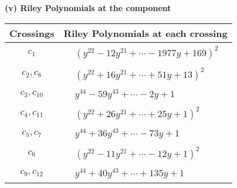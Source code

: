 \documentclass[1p]{elsarticle_modified}
\theoremstyle{definition}
\begin{document}
\newpage\renewcommand{\arraystretch}{1}
\flushleft \textbf{(v) Riley Polynomials at the component}\newline \\
\begin{tabular}{m{50pt}|m{274pt}}
Crossings & \hspace{64pt}Riley Polynomials at each crossing \\
\hline $$\begin{aligned}c_{1}\end{aligned}$$&$\begin{aligned}
&(y^{22}-12 y^{21}+\cdots-1977 y+169)^{2}
\end{aligned}$\\
\hline $$\begin{aligned}c_{2},c_{8}\end{aligned}$$&$\begin{aligned}
&(y^{22}+16 y^{21}+\cdots+51 y+13)^{2}
\end{aligned}$\\
\hline $$\begin{aligned}c_{3},c_{10}\end{aligned}$$&$\begin{aligned}
&y^{44}-59 y^{43}+\cdots-2 y+1
\end{aligned}$\\
\hline $$\begin{aligned}c_{4},c_{11}\end{aligned}$$&$\begin{aligned}
&(y^{22}+26 y^{21}+\cdots+25 y+1)^{2}
\end{aligned}$\\
\hline $$\begin{aligned}c_{5},c_{7}\end{aligned}$$&$\begin{aligned}
&y^{44}+36 y^{43}+\cdots-73 y+1
\end{aligned}$\\
\hline $$\begin{aligned}c_{6}\end{aligned}$$&$\begin{aligned}
&(y^{22}-11 y^{21}+\cdots-12 y+1)^{2}
\end{aligned}$\\
\hline $$\begin{aligned}c_{9},c_{12}\end{aligned}$$&$\begin{aligned}
&y^{44}+40 y^{43}+\cdots+135 y+1
\end{aligned}$\\
\hline
\end{tabular}\\~\\
\end{document}
